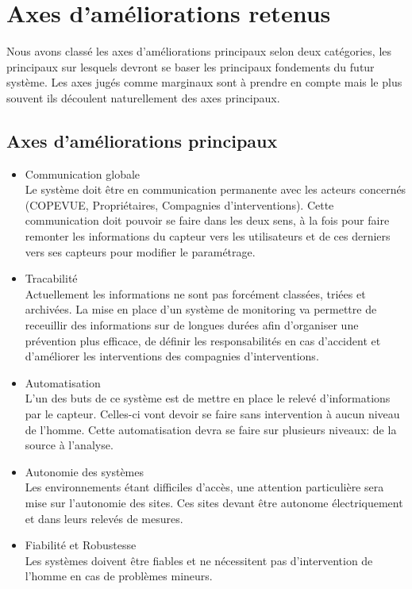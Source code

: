 \section{Axes d'améliorations retenus}

Nous avons classé les axes d'améliorations principaux selon deux catégories, les principaux sur lesquels devront se baser les principaux fondements du futur système. Les axes jugés comme marginaux sont à prendre en compte mais le plus souvent ils découlent naturellement des axes principaux. 

\subsection{Axes d'améliorations principaux}

\begin{itemize}

	\item Communication globale \\

	Le système doit être en communication permanente avec les acteurs concernés (COPEVUE, Propriétaires, Compagnies d'interventions). Cette communication doit pouvoir se faire dans les deux sens, à la fois pour faire remonter les informations du capteur vers les utilisateurs et de ces derniers vers ses capteurs pour modifier le paramétrage. 

	\item Tracabilité \\

	Actuellement les informations ne sont pas forcément classées, triées et archivées. La mise en place d'un système de monitoring va permettre de receuillir des informations sur de longues durées afin d'organiser une prévention plus efficace, de définir les responsabilités en cas d'accident et d'améliorer les interventions des compagnies d'interventions.

	\item Automatisation \\
	
	L'un des buts de ce système est de mettre en place le relevé d'informations par le capteur. Celles-ci vont devoir se faire sans intervention à aucun niveau de l'homme. Cette automatisation devra se faire sur plusieurs niveaux: de la source à l'analyse. 
	
	\item Autonomie des systèmes \\

	Les environnements étant difficiles d'accès, une attention particulière sera mise sur l'autonomie des sites. Ces sites devant être autonome électriquement et dans leurs relevés de mesures.

	\item Fiabilité et Robustesse \\

	Les systèmes doivent être fiables et ne nécessitent pas d'intervention de l'homme en cas de problèmes mineurs.

\end{itemize}


